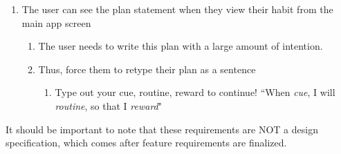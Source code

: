 \begin{enumerate}
        \item The user can see the plan statement when they view their habit from the main app screen
        \begin{enumerate}
            \item The user needs to write this plan with a large amount of intention.
            \item Thus, force them to retype their plan as a sentence
            \begin{enumerate}
                \item Type out your cue, routine, reward to continue! “When \textit{cue}, I will \textit{routine}, so that I \textit{reward}"
            \end{enumerate}
        \end{enumerate}
    \end{enumerate}
    It should be important to note that these requirements are NOT a design specification, which comes after feature requirements are finalized.
    




